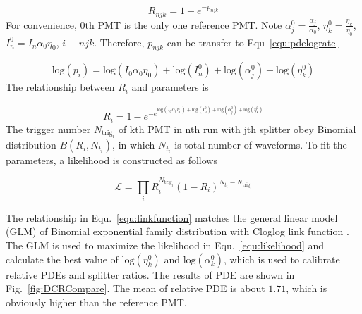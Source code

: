 \begin{equation}
    \label{equ:pderate}
    R_{njk}=1-e^{-p_{njk}}
\end{equation}
For convenience, 0th PMT is the only one reference PMT. Note $\alpha_j^0=\frac{\alpha_j}{\alpha_0}$, $\eta_k^0=\frac{\eta_k}{\eta_0}$, $I_n^0=I_n\alpha_0\eta_0$, $i\equiv njk$. Therefore, $p_{njk}$ can be transfer to Equ~\eqref{equ:pdelograte}

\begin{equation}
    \label{equ:pdelograte}
    \mathrm{log}(p_{i})=\mathrm{log}(I_0\alpha_0\eta_0)+\mathrm{log}(I_n^0)+\mathrm{log}(\alpha_j^0)+\mathrm{log}(\eta_k^0)
\end{equation}
The relationship between $R_{i}$ and parameters is

\begin{equation}
    \label{equ:linkfunction}
    R_{i}=1-e^{-e^{\mathrm{log}(I_0\alpha_0\eta_0)+\mathrm{log}(I_n^0)+\mathrm{log}(\alpha_j^0)+\mathrm{log}(\eta_k^0)}}
\end{equation}
The trigger number $N_{{\mathrm{trig}_{i}}}$ of kth PMT in nth run with jth splitter obey Binomial distribution $B(R_{i},N_{t_{i}})$, in which $N_{t_{i}}$ is total number of waveforms. To fit the parameters, a likelihood is constructed as follows

\begin{equation}
    \label{equ:likelihood}
    \mathcal{L}=\prod_{i}{R_{i}^{N_{\mathrm{trig}_{i}}}(1-R_{i})^{N_{t_{i}}-N_{\mathrm{trig}_{i}}}}
\end{equation}

The relationship in Equ.~\eqref{equ:linkfunction} matches the general linear model (GLM) of Binomial exponential family distribution with Cloglog link function \cite{glm}. The GLM is used to maximize the likelihood in Equ.~\eqref{equ:likelihood} and calculate the best value of $\mathrm{log}(\eta_k^0)$ and $\mathrm{log}(\alpha_k^0)$, which is used to calibrate relative PDEs and splitter ratios. The results of PDE are shown in Fig.~\ref{fig:DCRCompare}. The mean of relative PDE is about $1.71$, which is obviously higher than the reference PMT.

